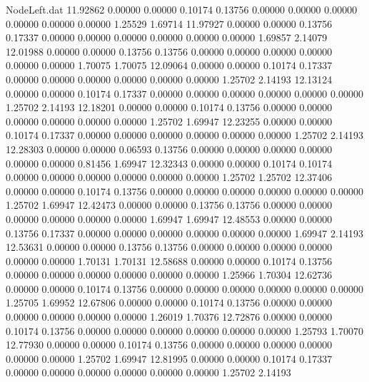 \begin{filecontents}{NodeLeft.dat}
  11.92862    0.00000    0.00000     0.10174    0.13756    0.00000    0.00000    0.00000    0.00000    0.00000    0.00000    1.25529    1.69714
  11.97927    0.00000    0.00000     0.13756    0.17337    0.00000    0.00000    0.00000    0.00000    0.00000    0.00000    1.69857    2.14079
  12.01988    0.00000    0.00000     0.13756    0.13756    0.00000    0.00000    0.00000    0.00000    0.00000    0.00000    1.70075    1.70075
  12.09064    0.00000    0.00000     0.10174    0.17337    0.00000    0.00000    0.00000    0.00000    0.00000    0.00000    1.25702    2.14193
  12.13124    0.00000    0.00000     0.10174    0.17337    0.00000    0.00000    0.00000    0.00000    0.00000    0.00000    1.25702    2.14193
  12.18201    0.00000    0.00000     0.10174    0.13756    0.00000    0.00000    0.00000    0.00000    0.00000    0.00000    1.25702    1.69947
  12.23255    0.00000    0.00000     0.10174    0.17337    0.00000    0.00000    0.00000    0.00000    0.00000    0.00000    1.25702    2.14193
  12.28303    0.00000    0.00000     0.06593    0.13756    0.00000    0.00000    0.00000    0.00000    0.00000    0.00000    0.81456    1.69947
  12.32343    0.00000    0.00000     0.10174    0.10174    0.00000    0.00000    0.00000    0.00000    0.00000    0.00000    1.25702    1.25702
  12.37406    0.00000    0.00000     0.10174    0.13756    0.00000    0.00000    0.00000    0.00000    0.00000    0.00000    1.25702    1.69947
  12.42473    0.00000    0.00000     0.13756    0.13756    0.00000    0.00000    0.00000    0.00000    0.00000    0.00000    1.69947    1.69947
  12.48553    0.00000    0.00000     0.13756    0.17337    0.00000    0.00000    0.00000    0.00000    0.00000    0.00000    1.69947    2.14193
  12.53631    0.00000    0.00000     0.13756    0.13756    0.00000    0.00000    0.00000    0.00000    0.00000    0.00000    1.70131    1.70131
  12.58688    0.00000    0.00000     0.10174    0.13756    0.00000    0.00000    0.00000    0.00000    0.00000    0.00000    1.25966    1.70304
  12.62736    0.00000    0.00000     0.10174    0.13756    0.00000    0.00000    0.00000    0.00000    0.00000    0.00000    1.25705    1.69952
  12.67806    0.00000    0.00000     0.10174    0.13756    0.00000    0.00000    0.00000    0.00000    0.00000    0.00000    1.26019    1.70376
  12.72876    0.00000    0.00000     0.10174    0.13756    0.00000    0.00000    0.00000    0.00000    0.00000    0.00000    1.25793    1.70070
  12.77930    0.00000    0.00000     0.10174    0.13756    0.00000    0.00000    0.00000    0.00000    0.00000    0.00000    1.25702    1.69947
  12.81995    0.00000    0.00000     0.10174    0.17337    0.00000    0.00000    0.00000    0.00000    0.00000    0.00000    1.25702    2.14193

\end{filecontents}
